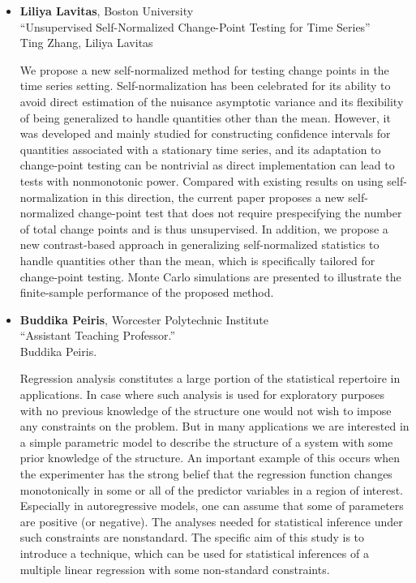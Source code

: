 \begin{itemize}
\item \textbf{Liliya Lavitas}, Boston University \\
``Unsupervised Self-Normalized Change-Point Testing for Time Series'' \\
Ting Zhang, Liliya Lavitas


We propose a new self-normalized method for testing change points in the time series setting. Self-normalization has been celebrated for its ability to avoid direct estimation of the nuisance asymptotic variance and its flexibility of being generalized to handle quantities other than the mean. However, it was developed and mainly studied for constructing confidence intervals for quantities associated with a stationary time series, and its adaptation to change-point testing can be nontrivial as direct implementation can lead to tests with nonmonotonic power. Compared with existing results on using self-normalization in this direction, the current paper proposes a new self-normalized change-point test that does not require prespecifying the number of total change points and is thus unsupervised. In addition, we propose a new contrast-based approach in generalizing self-normalized statistics to handle quantities other than the mean, which is specifically tailored for change-point testing. Monte Carlo simulations are presented to illustrate the finite-sample performance of the proposed method.

\item \textbf{Buddika Peiris}, Worcester Polytechnic Institute \\
``Assistant Teaching Professor.'' \\
Buddika Peiris.


Regression analysis constitutes a large portion of the statistical repertoire in applications. In case
where such analysis is used for exploratory purposes with no previous knowledge of the structure
one would not wish to impose any constraints on the problem. But in many applications we are
interested in a simple parametric model to describe the structure of a system with some prior
knowledge of the structure. An important example of this occurs when the experimenter has the
strong belief that the regression function changes monotonically in some or all of the predictor
variables in a region of interest. Especially in autoregressive models, one can assume that some of
parameters are positive (or negative). The analyses needed for statistical inference under such
constraints are nonstandard. The specific aim of this study is to introduce a technique, which can
be used for statistical inferences of a multiple linear regression with some non-standard constraints.


\end{itemize}
